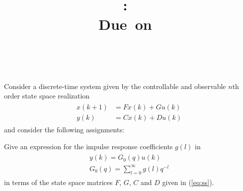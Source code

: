 \documentclass{report} %
\title{\vspace{2in}\textmd{\textbf{\hmwkClass:\ \hmwkTitle\ifthenelse{\equal{\hmwkSubTitle}{}}{}{\\\hmwkSubTitle}}}\\\normalsize\vspace{0.1in}\small{Due\ on\ \hmwkDueDate}\\\vspace{0.1in}\large{\textit{\hmwkClassInstructor\ \hmwkClassTime}}\vspace{3in}}
\date{}
\author{\hmwkAuthor}
\begin{document}
\begin{spacing}{1.1}
\maketitle
%

\newpage
\thispagestyle{empty}
\mbox{}
\newpage
{}

\begin{homeworkProblem}
Consider a discrete-time system given by the controllable and observable $n$th order state space realization
\begin{align}
\label{eq:ss}
\begin{split}
x(k+1) &= Fx(k)+Gu(k) \\
y(k) &= Cx(k) + Du(k)
\end{split}
\end{align}
and consider the following assignments:

\begin{homeworkSection}{1.1}
Give an expression for the impulse response coefficients $g(l)$ in
\begin{align}
\begin{split}
y(k) = G_0(q)u(k) \\
G_0(q) = \sum_{l=0}^\infty g(l)q^{-l}
\end{split}
\end{align}
in terms of the state space matrices $F$, $G$, $C$ and $D$ given in (\ref{eq:ss}).
\newline
{}
\end{homeworkSection}
\end{homeworkProblem}
\end{spacing}
\end{document}
